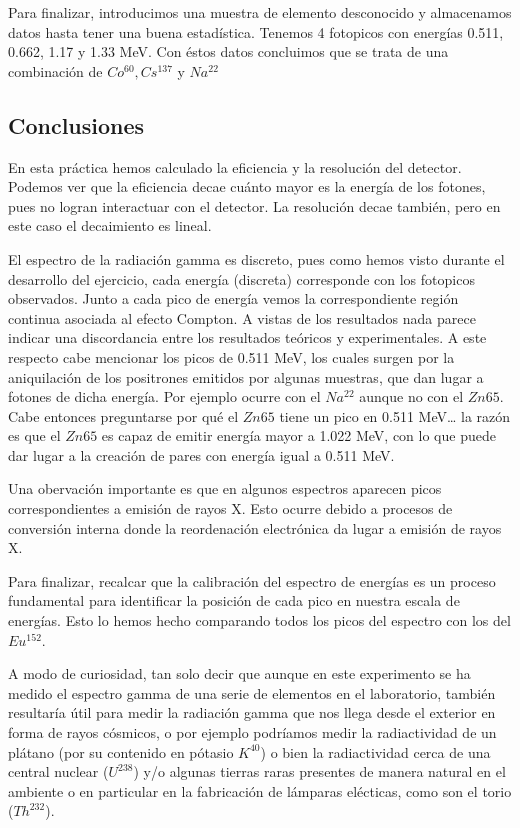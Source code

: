 \documentclass[11pt]{article}
\begin{document}
    Para finalizar, introducimos una muestra de elemento desconocido y
almacenamos datos hasta tener una buena estadística. Tenemos 4 fotopicos
con energías 0.511, 0.662, 1.17 y 1.33 MeV. Con éstos datos concluimos
que se trata de una combinación de \(Co^{60}, Cs^{137}\) y \(Na^{22}\)

    \hypertarget{conclusiones}{%
\subsection{Conclusiones}\label{conclusiones}}

En esta práctica hemos calculado la eficiencia y la resolución del
detector. Podemos ver que la eficiencia decae cuánto mayor es la energía
de los fotones, pues no logran interactuar con el detector. La
resolución decae también, pero en este caso el decaimiento es lineal.

El espectro de la radiación gamma es discreto, pues como hemos visto
durante el desarrollo del ejercicio, cada energía (discreta) corresponde
con los fotopicos observados. Junto a cada pico de energía vemos la
correspondiente región continua asociada al efecto Compton. A vistas de
los resultados nada parece indicar una discordancia entre los resultados
teóricos y experimentales. A este respecto cabe mencionar los picos de
0.511 MeV, los cuales surgen por la aniquilación de los positrones
emitidos por algunas muestras, que dan lugar a fotones de dicha energía.
Por ejemplo ocurre con el \(Na^{22}\) aunque no con el \(Zn{65}\). Cabe
entonces preguntarse por qué el \(Zn{65}\) tiene un pico en 0.511
MeV\ldots{} la razón es que el \(Zn{65}\) es capaz de emitir energía
mayor a 1.022 MeV, con lo que puede dar lugar a la creación de pares con
energía igual a 0.511 MeV.

Una obervación importante es que en algunos espectros aparecen picos
correspondientes a emisión de rayos X. Esto ocurre debido a procesos de
conversión interna donde la reordenación electrónica da lugar a emisión
de rayos X.

Para finalizar, recalcar que la calibración del espectro de energías es
un proceso fundamental para identificar la posición de cada pico en
nuestra escala de energías. Esto lo hemos hecho comparando todos los
picos del espectro con los del \(Eu^{152}\).

A modo de curiosidad, tan solo decir que aunque en este experimento se
ha medido el espectro gamma de una serie de elementos en el laboratorio,
también resultaría útil para medir la radiación gamma que nos llega
desde el exterior en forma de rayos cósmicos, o por ejemplo podríamos
medir la radiactividad de un plátano (por su contenido en pótasio
\(K^{40}\)) o bien la radiactividad cerca de una central nuclear
(\(U^{238}\)) y/o algunas tierras raras presentes de manera natural en
el ambiente o en particular en la fabricación de lámparas elécticas,
como son el torio (\(Th^{232}\)).


    
    
    
\end{document}
